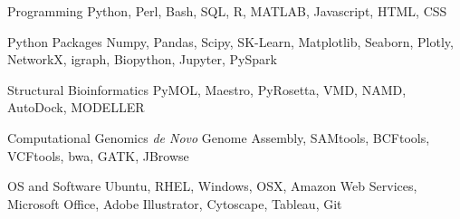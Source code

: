 \vspace{2mm}

\begin{cvskills}
	
	\cvskill
	{Programming} %
	{Python, Perl, Bash, SQL, R, MATLAB, Javascript, HTML, CSS} %
	
	\cvskill
	{Python Packages} %
	{Numpy, Pandas, Scipy, SK-Learn, Matplotlib, Seaborn, Plotly, NetworkX, igraph, Biopython, Jupyter, PySpark} %
	
	\cvskill
	{Structural Bioinformatics} %
	{PyMOL, Maestro, PyRosetta, VMD, NAMD, AutoDock, MODELLER} %
	
	\cvskill
	{Computational Genomics} %
	{\textit{de Novo} Genome Assembly, SAMtools, BCFtools, VCFtools, bwa, GATK, JBrowse} %
	
	\cvskill
	{OS and Software} %
	{Ubuntu, RHEL, Windows, OSX, Amazon Web Services, Microsoft Office, Adobe Illustrator, Cytoscape, Tableau, Git} %
	
	\vspace{-8.0mm}
\end{cvskills}
